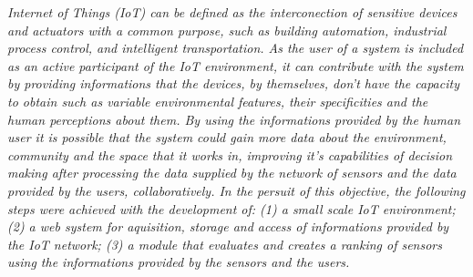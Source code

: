\emph{
Internet of Things (IoT) can be defined as the interconection of sensitive devices and actuators with a common purpose, such as building automation, industrial process control, and intelligent transportation. %
As the user of a system is included as an active participant of the IoT environment, it can contribute with the system by providing informations that the devices, by themselves, don't have the capacity to obtain such as variable environmental features, their specificities and the human perceptions about them.
 By using the informations provided by the human user it is possible that the system could gain more data about the environment, community and the space that it works in, improving it's capabilities of decision making after processing the data supplied by the network of sensors and the data provided by the users, collaboratively.
  In the persuit of this objective, the following steps were achieved with the development of: (1) a small scale IoT environment;
  (2) a web system for aquisition, storage and access of informations provided by the IoT network;
  (3) a module that evaluates and creates a ranking of sensors using the informations provided by the sensors and the users.
}
